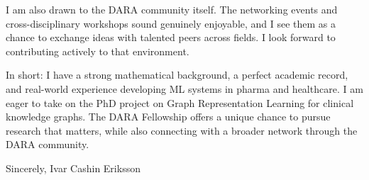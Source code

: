 \documentclass[11pt,a4paper]{moderncv}
\begin{document}
\hspace*{2em}
I am also drawn to the DARA community itself. The networking events and cross-disciplinary workshops sound genuinely enjoyable, and I see them as a chance to exchange ideas with talented peers across fields. I look forward to contributing actively to that environment.

\hspace*{2em}
In short: I have a strong mathematical background, a perfect academic record, and real-world experience developing ML systems in pharma and healthcare. I am eager to take on the PhD project on Graph Representation Learning for clinical knowledge graphs. The DARA Fellowship offers a unique chance to pursue research that matters, while also connecting with a broader network through the DARA community.

\vspace{3 mm} 
Sincerely, Ivar Cashin Eriksson
\end{document}
